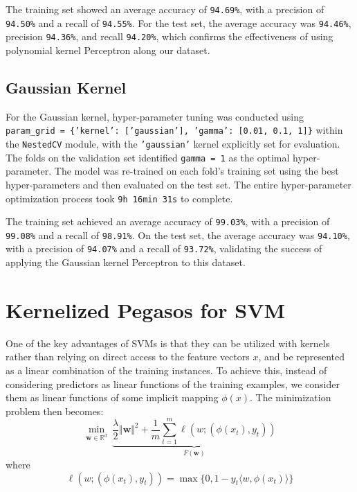The training set showed an average accuracy of \texttt{94.69\%}, with a precision of \texttt{94.50\%} and a recall of \texttt{94.55\%}. For the test set, the average accuracy was \texttt{94.46\%}, precision \texttt{94.36\%}, and recall \texttt{94.20\%}, which confirms the effectiveness of using polynomial kernel Perceptron along our dataset.

\subsection{Gaussian Kernel}

For the Gaussian kernel, hyper-parameter tuning was conducted using \texttt{param\_grid = \{'kernel': ['gaussian'], 'gamma': [0.01, 0.1, 1]\}} within the \texttt{NestedCV} module, with the \texttt{'gaussian'} kernel explicitly set for evaluation. The folds on the validation set identified \texttt{gamma = 1} as the optimal hyper-parameter. The model was re-trained on each fold's training set using the best hyper-parameters and then evaluated on the test set. The entire hyper-parameter optimization process took \texttt{9h 16min 31s} to complete.

The training set achieved an average accuracy of \texttt{99.03\%}, with a precision of \texttt{99.08\%} and a recall of \texttt{98.91\%}. On the test set, the average accuracy was \texttt{94.10\%}, with a precision of \texttt{94.07\%} and a recall of \texttt{93.72\%}, validating the success of applying the Gaussian kernel Perceptron to this dataset.


\section{Kernelized Pegasos for SVM}

One of the key advantages of SVMs is that they can be utilized with kernels rather than relying on direct access to the feature vectors $x$, and be represented as a linear combination of the training instances. To achieve this, instead of considering predictors as linear functions of the training examples, we consider them as linear functions of some implicit mapping $\phi(x)$. The minimization problem then becomes:
\begin{equation}
    \underset{\boldsymbol{w} \in \mathbb{R}^d}{\min} \ \underbrace{\frac{\lambda}{2} \Vert \boldsymbol{w} \Vert^2 + \frac{1}{m} \sum_{t = 1}^m \ell(w; (\phi(x_t),y_t))}_{F(\boldsymbol{w})}
\end{equation}
where
\begin{equation}
    \ell(w; (\phi(x_t),y_t)) = \max\{0, 1-y_t \langle w, \phi(x_t) \rangle \}
\end{equation}

